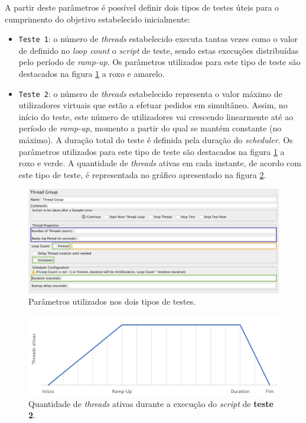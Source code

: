 A partir deste parâmetros é possível definir dois tipos de testes úteis para o cumprimento do objetivo estabelecido inicialmente:

\begin{itemize}
    \item \texttt{Teste 1}: o número de \textit{threads} estabelecido executa tantas vezes como o valor de definido no \textit{loop count} o \textit{script} de teste, sendo estas execuções distribuídas pelo período de \textit{ramp-up}. Os parâmetros utilizados para este tipo de teste são destacados na figura \ref{fig:jmeter_parametros} a roxo e amarelo.
    \item \texttt{Teste 2}: o número de \textit{threads} estabelecido representa o valor máximo de utilizadores virtuais que estão a efetuar pedidos em simultâneo. Assim, no início do teste, este número de utilizadores vai crescendo linearmente até ao período de \textit{ramp-up}, momento a partir do qual se mantém constante (no máximo). A duração total do teste é definida pela duração do \textit{scheduler}. Os parâmetros utilizados para este tipo de teste são destacados na figura \ref{fig:jmeter_parametros} a roxo e verde. A quantidade de \textit{threads} ativas em cada instante, de acordo com este tipo de teste, é representada no gráfico apresentado na figura \ref{fig:jmeter_ramp_up_test}.
\end{itemize}

\begin{figure}[H]
    \centering
    \includegraphics[width=1\textwidth]{images/Testes/ParametrosGroupThread.png}
    \caption{Parâmetros utilizados nos dois tipos de testes.}
    \label{fig:jmeter_parametros}
\end{figure}

\begin{figure}[H]
    \centering
    \includegraphics[width=1\textwidth]{images/Testes/ramp_up_test.PNG}
    \caption{Quantidade de \textit{threads} ativas durante a execução do \textit{script} de \textbf{teste 2}.}
    \label{fig:jmeter_ramp_up_test}
\end{figure}


